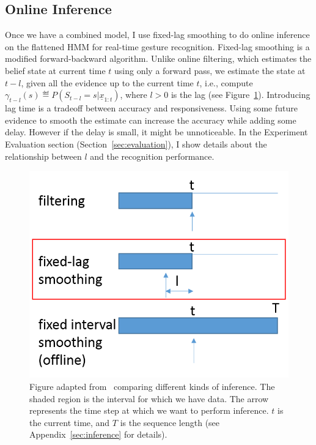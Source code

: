 \subsection{Online Inference}
Once we have a combined model, I use fixed-lag smoothing \cite{murphy02} to do
online inference on the flattened HMM for real-time gesture recognition.
Fixed-lag smoothing is a modified forward-backward algorithm. Unlike online
filtering, which estimates the belief state at current time $t$ using
only a forward pass, we estimate the state at $t - l$, given all the
evidence up to the current time $t$, i.e., compute $\gamma_{t - l}(s) \eqdef P(S_{t -
l} = s|\underline{x}_{1:t})$, where $l > 0$ is the lag (see
Figure~\ref{fig:inference}).
Introducing lag time is a tradeoff between accuracy and responsiveness. Using some future evidence to
smooth the estimate can increase the accuracy while adding some delay. However
if the delay is small, it might be unnoticeable.
In the Experiment Evaluation section (Section~\ref{sec:evaluation}), I show
details about the relationship between $l$ and the recognition performance.

\begin{figure}[tbh]
\centering
\includegraphics[width=0.5\columnwidth]{figures/inference.png}
\caption{Figure adapted from~\cite{murphy02} comparing different kinds of
inference. The shaded region is the interval for which we have data. The arrow
represents the time step at which we want to perform inference. $t$ is the
current time, and $T$ is the sequence length (see Appendix~\ref{sec:inference}
for details).}
\label{fig:inference}
\end{figure}

